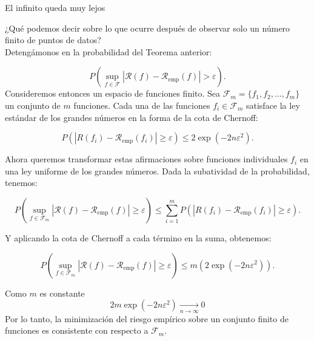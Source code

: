 \documentclass[aspectratio=169, 10pt]{beamer}
\begin{document}
\begin{frame}{El infinito queda muy lejos}

¿Qué podemos decir sobre lo que ocurre después de observar solo un número finito de puntos de datos?\\

 Detengámonos en la probabilidad del Teorema anterior:

\begin{equation*}
P\left(\sup_{f \in \mathcal{F}} |\mathcal{R}(f) - \mathcal{R}_{\text{emp}}(f)| > \varepsilon \right). \label{eq:med_unif_riesgo_riesgo_emp}
\end{equation*}
\pause
Consideremos entonces un espacio de funciones finito. Sea
\(\mathcal{F}_{m} = \{f_1, f_2, \dots, f_m\}\) un conjunto de \(m\) funciones. Cada una de las funciones
\(f_i \in \mathcal{F}_{m}\) satisface la ley estándar de los grandes números en la forma de la cota de Chernoff:

\[
P\left(|R(f_i) - \mathcal{R}_{\text{emp}}(f_i)| \geq \varepsilon \right) \leq 2 \exp(-2n\varepsilon^2).
\]


 \end{frame}

\begin{frame}
Ahora queremos transformar estas afirmaciones sobre funciones individuales \(f_i\) en una ley uniforme de los
grandes números. Dada la subatividad de la probabilidad, tenemos:

\[
P\left(\sup_{f \in \mathcal{F}_m} |\mathcal{R}(f) - \mathcal{R}_{\text{emp}}(f)| \geq \varepsilon \right) \leq \sum_{i=1}^m P\left(|R(f_i) - \mathcal{R}_{\text{emp}}(f_i)| \geq \varepsilon \right).
\]

\pause

  Y aplicando la cota de Chernoff a cada término en la suma, obtenemos:

\begin{equation*}
P\left(\sup_{f \in \mathcal{F}_m} |\mathcal{R}(f) - \mathcal{R}_{\text{emp}}(f)| \geq \varepsilon \right) \leq m\left( 2 \exp(-2n\varepsilon^2) \right).
\end{equation*}

\pause
Como \(m\) es constante
\[2m \exp(-2n\varepsilon^2)\xrightarrow[n\to\infty]{} 0 \]
\pause
Por lo tanto,
la minimización del riesgo empírico sobre un conjunto finito de funciones es consistente con respecto
a \(\mathcal{F}_{m}\).

\end{frame}
\end{document}
